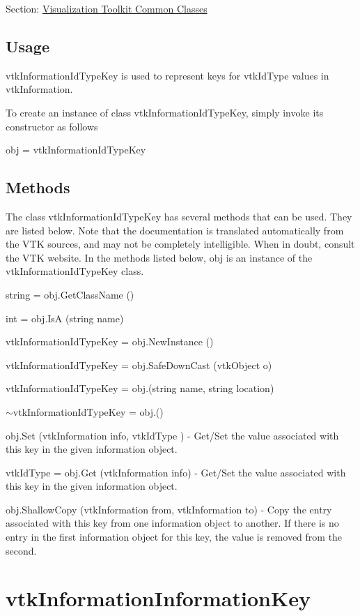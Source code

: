 Section\-: \hyperlink{sec_vtkcommon}{Visualization Toolkit Common Classes} \hypertarget{vtkwidgets_vtkxyplotwidget_Usage}{}\subsection{Usage}\label{vtkwidgets_vtkxyplotwidget_Usage}
vtk\-Information\-Id\-Type\-Key is used to represent keys for vtk\-Id\-Type values in vtk\-Information.

To create an instance of class vtk\-Information\-Id\-Type\-Key, simply invoke its constructor as follows \begin{DoxyVerb}  obj = vtkInformationIdTypeKey
\end{DoxyVerb}
 \hypertarget{vtkwidgets_vtkxyplotwidget_Methods}{}\subsection{Methods}\label{vtkwidgets_vtkxyplotwidget_Methods}
The class vtk\-Information\-Id\-Type\-Key has several methods that can be used. They are listed below. Note that the documentation is translated automatically from the V\-T\-K sources, and may not be completely intelligible. When in doubt, consult the V\-T\-K website. In the methods listed below, {\ttfamily obj} is an instance of the vtk\-Information\-Id\-Type\-Key class. 
\begin{DoxyItemize}
\item {\ttfamily string = obj.\-Get\-Class\-Name ()}  
\item {\ttfamily int = obj.\-Is\-A (string name)}  
\item {\ttfamily vtk\-Information\-Id\-Type\-Key = obj.\-New\-Instance ()}  
\item {\ttfamily vtk\-Information\-Id\-Type\-Key = obj.\-Safe\-Down\-Cast (vtk\-Object o)}  
\item {\ttfamily vtk\-Information\-Id\-Type\-Key = obj.(string name, string location)}  
\item {\ttfamily $\sim$vtk\-Information\-Id\-Type\-Key = obj.()}  
\item {\ttfamily obj.\-Set (vtk\-Information info, vtk\-Id\-Type )} -\/ Get/\-Set the value associated with this key in the given information object.  
\item {\ttfamily vtk\-Id\-Type = obj.\-Get (vtk\-Information info)} -\/ Get/\-Set the value associated with this key in the given information object.  
\item {\ttfamily obj.\-Shallow\-Copy (vtk\-Information from, vtk\-Information to)} -\/ Copy the entry associated with this key from one information object to another. If there is no entry in the first information object for this key, the value is removed from the second.  
\end{DoxyItemize}\hypertarget{vtkcommon_vtkinformationinformationkey}{}\section{vtk\-Information\-Information\-Key}\label{vtkcommon_vtkinformationinformationkey}
